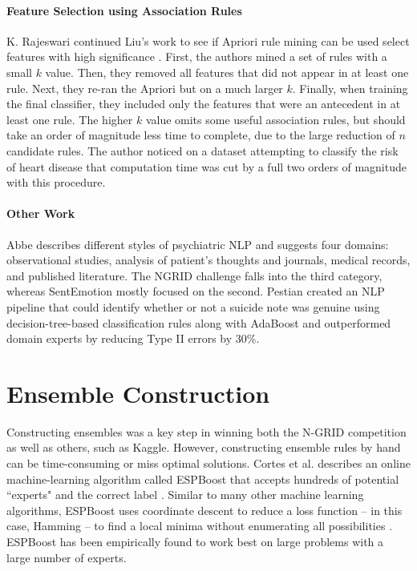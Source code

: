 \paragraph{Feature Selection using Association Rules} K. Rajeswari continued Liu's work to see if \textsf{Apriori} rule mining can be used select features with high significance \cite{rajeswari}. First, the authors mined a set of rules with a small $k$ value. Then, they removed all features that did not appear in at least one rule. Next, they re-ran the \textsf{Apriori} but on a much larger $k$. Finally, when training the final classifier, they included only the features that were an antecedent in at least one rule. The higher $k$ value omits some useful association rules, but should take an order of magnitude less time to complete, due to the large reduction of $n$ candidate rules. The author noticed on a dataset attempting to classify the risk of heart disease that computation time was cut by a full two orders of magnitude with this procedure.

\paragraph{Other Work} Abbe \cite{abbe} describes different styles of psychiatric NLP and suggests four domains: observational studies, analysis of patient's thoughts and journals, medical records, and published literature. The NGRID challenge falls into the third category, whereas SentEmotion mostly focused on the second. Pestian \cite{pestian} created an NLP pipeline that could identify whether or not a suicide note was genuine using decision-tree-based classification rules along with AdaBoost and outperformed domain experts by reducing Type II errors by 30\%.

\section{Ensemble Construction} Constructing ensembles was a key step in winning both the N-GRID competition as well as others, such as Kaggle. However, constructing ensemble rules by hand can be time-consuming or miss optimal solutions. Cortes et al. describes an online machine-learning algorithm called \textsf{ESPBoost} that accepts hundreds of potential ``experts" and the correct label \cite{espboost}. Similar to many other machine learning algorithms, \textsf{ESPBoost} uses coordinate descent to reduce a loss function -- in this case, Hamming -- to find a local minima without enumerating all possibilities \cite{coordinate-descent,hamming-loss}. \textsf{ESPBoost} has been empirically found to work best on large problems with a large number of experts.
 